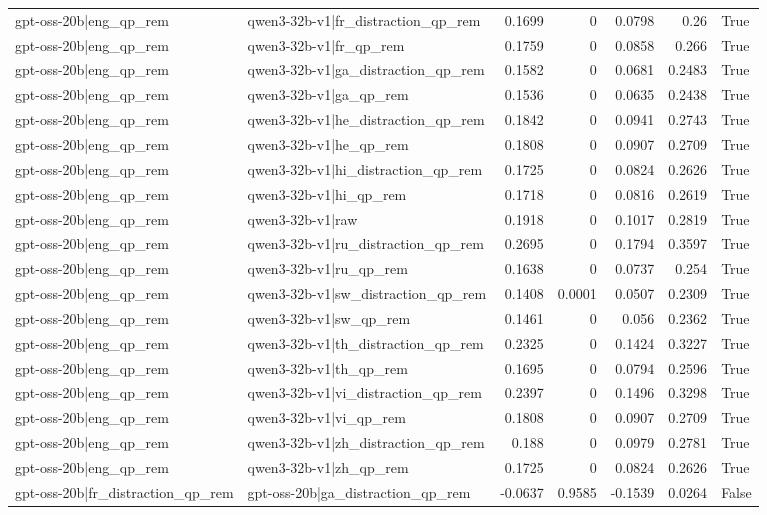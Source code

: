 \begin{table}
\begin{tabular}{l l r r r r l}
gpt-oss-20b|eng_qp_rem & qwen3-32b-v1|fr_distraction_qp_rem & 0.1699 & 0 & 0.0798 & 0.26 & True \\
gpt-oss-20b|eng_qp_rem & qwen3-32b-v1|fr_qp_rem & 0.1759 & 0 & 0.0858 & 0.266 & True \\
gpt-oss-20b|eng_qp_rem & qwen3-32b-v1|ga_distraction_qp_rem & 0.1582 & 0 & 0.0681 & 0.2483 & True \\
gpt-oss-20b|eng_qp_rem & qwen3-32b-v1|ga_qp_rem & 0.1536 & 0 & 0.0635 & 0.2438 & True \\
gpt-oss-20b|eng_qp_rem & qwen3-32b-v1|he_distraction_qp_rem & 0.1842 & 0 & 0.0941 & 0.2743 & True \\
gpt-oss-20b|eng_qp_rem & qwen3-32b-v1|he_qp_rem & 0.1808 & 0 & 0.0907 & 0.2709 & True \\
gpt-oss-20b|eng_qp_rem & qwen3-32b-v1|hi_distraction_qp_rem & 0.1725 & 0 & 0.0824 & 0.2626 & True \\
gpt-oss-20b|eng_qp_rem & qwen3-32b-v1|hi_qp_rem & 0.1718 & 0 & 0.0816 & 0.2619 & True \\
gpt-oss-20b|eng_qp_rem & qwen3-32b-v1|raw & 0.1918 & 0 & 0.1017 & 0.2819 & True \\
gpt-oss-20b|eng_qp_rem & qwen3-32b-v1|ru_distraction_qp_rem & 0.2695 & 0 & 0.1794 & 0.3597 & True \\
gpt-oss-20b|eng_qp_rem & qwen3-32b-v1|ru_qp_rem & 0.1638 & 0 & 0.0737 & 0.254 & True \\
gpt-oss-20b|eng_qp_rem & qwen3-32b-v1|sw_distraction_qp_rem & 0.1408 & 0.0001 & 0.0507 & 0.2309 & True \\
gpt-oss-20b|eng_qp_rem & qwen3-32b-v1|sw_qp_rem & 0.1461 & 0 & 0.056 & 0.2362 & True \\
gpt-oss-20b|eng_qp_rem & qwen3-32b-v1|th_distraction_qp_rem & 0.2325 & 0 & 0.1424 & 0.3227 & True \\
gpt-oss-20b|eng_qp_rem & qwen3-32b-v1|th_qp_rem & 0.1695 & 0 & 0.0794 & 0.2596 & True \\
gpt-oss-20b|eng_qp_rem & qwen3-32b-v1|vi_distraction_qp_rem & 0.2397 & 0 & 0.1496 & 0.3298 & True \\
gpt-oss-20b|eng_qp_rem & qwen3-32b-v1|vi_qp_rem & 0.1808 & 0 & 0.0907 & 0.2709 & True \\
gpt-oss-20b|eng_qp_rem & qwen3-32b-v1|zh_distraction_qp_rem & 0.188 & 0 & 0.0979 & 0.2781 & True \\
gpt-oss-20b|eng_qp_rem & qwen3-32b-v1|zh_qp_rem & 0.1725 & 0 & 0.0824 & 0.2626 & True \\
gpt-oss-20b|fr_distraction_qp_rem & gpt-oss-20b|ga_distraction_qp_rem & -0.0637 & 0.9585 & -0.1539 & 0.0264 & False \\

\end{tabular}
\end{table}
